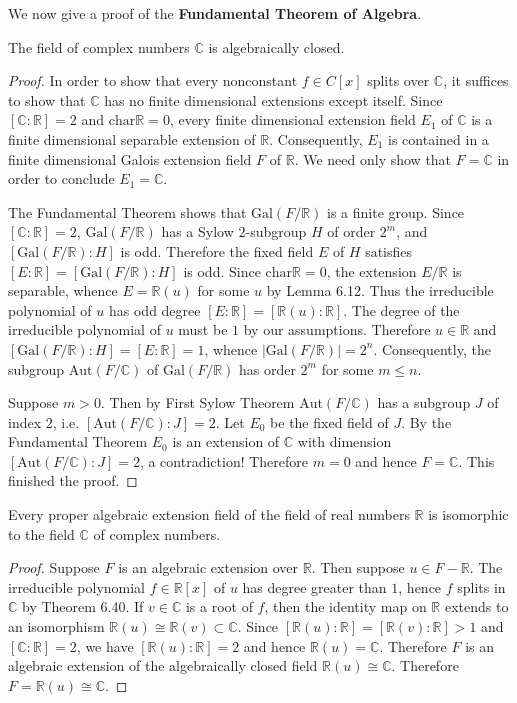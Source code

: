 We now give a proof of the \textbf{Fundamental Theorem of Algebra}.
\begin{theorem}
The field of complex numbers $\mathbb{C}$ is algebraically closed.
\end{theorem}
\begin{proof}
In order to show that every nonconstant $f\in C[x]$ splits over $\mathbb{C}$, it suffices to show that $\mathbb{C}$ has no finite dimensional extensions except itself. Since $[\mathbb{C}:\mathbb{R}]=2$ and $\mathrm{char}\mathbb{R}=0$, every finite dimensional extension field $E_1$ of $\mathbb{C}$ is a finite dimensional separable extension of $\mathbb{R}$. Consequently, $E_1$ is contained in a finite dimensional Galois extension field $F$ of $\mathbb{R}$. We need only show that $F=\mathbb{C}$ in order to conclude $E_1=\mathbb{C}$.\par
The Fundamental Theorem shows that $\mathrm{Gal}(F/\mathbb{R})$ is a finite group. Since $[\mathbb{C}:\mathbb{R}]=2$, $\mathrm{Gal}(F/\mathbb{R})$ has a Sylow $2$-subgroup $H$ of order $2^m$, and $[\mathrm{Gal}(F/\mathbb{R}):H]$ is odd. Therefore the fixed field $E$ of $H$ satisfies $[E:\mathbb{R}]=[\mathrm{Gal}(F/\mathbb{R}):H]$ is odd. Since $\mathrm{char}\mathbb{R}=0$, the extension $E/\mathbb{R}$ is separable, whence $E=\mathbb{R}(u)$ for some $u$ by Lemma 6.12. Thus the irreducible polynomial of $u$ has odd degree $[E:\mathbb{R}]=[\mathbb{R}(u):\mathbb{R}]$. The degree of the irreducible polynomial of $u$ must be $1$ by our assumptions. Therefore $u\in\mathbb{R}$ and $[\mathrm{Gal}(F/\mathbb{R}):H]=[E:\mathbb{R}]=1$, whence $|\mathrm{Gal}(F/\mathbb{R})|=2^n$. Consequently, the subgroup $\mathrm{Aut}(F/\mathbb{C})$ of $\mathrm{Gal}(F/\mathbb{R})$ has order $2^m$ for some $m\le n$.\par
Suppose $m>0$. Then by First Sylow Theorem $\mathrm{Aut}(F/\mathbb{C})$ has a subgroup $J$ of index $2$, i.e. $[\mathrm{Aut}(F/\mathbb{C}):J]=2$. Let $E_0$ be the fixed field of $J$. By the Fundamental Theorem $E_0$ is an extension of $\mathbb{C}$ with dimension $[\mathrm{Aut}(F/\mathbb{C}):J]=2$, a contradiction! Therefore $m=0$ and hence $F=\mathbb{C}$. This finished the proof.
\end{proof}
\begin{corollary}
Every proper algebraic extension field of the field of real numbers $\mathbb{R}$ is isomorphic to the field $\mathbb{C}$ of complex numbers.
\end{corollary}
\begin{proof}
Suppose $F$ is an algebraic extension over $\mathbb{R}$. Then suppose $u\in F-\mathbb{R}$. The irreducible polynomial $f\in\mathbb{R}[x]$ of $u$ has degree greater than $1$, hence $f$ splits in $\mathbb{C}$ by Theorem 6.40. If $v\in\mathbb{C}$ is a root of $f$, then the identity map on $\mathbb{R}$ extends to an isomorphism $\mathbb{R}(u)\cong\mathbb{R}(v)\subset\mathbb{C}$. Since $[\mathbb{R}(u):\mathbb{R}]=[\mathbb{R}(v):\mathbb{R}]>1$ and $[\mathbb{C}:\mathbb{R}]=2$, we have $[\mathbb{R}(u):\mathbb{R}]=2$ and hence $\mathbb{R}(u)=\mathbb{C}$. Therefore $F$ is an algebraic extension of the algebraically closed field $\mathbb{R}(u)\cong\mathbb{C}$. Therefore $F=\mathbb{R}(u)\cong\mathbb{C}$.
\end{proof}
